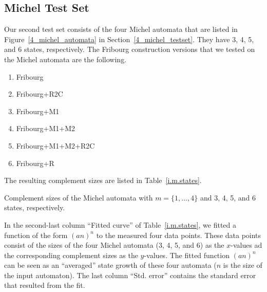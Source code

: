 


\subsection{Michel Test Set}
\label{5_internal_michel}
Our second test set consists of the four Michel automata that are listed in Figure~\ref{4_michel_automata} in Section~\ref{4_michel_testset}. They have 3, 4, 5, and 6 states, respectively. The Fribourg construction versions that we tested on the Michel automata are the following.
\begin{enumerate}
\item Fribourg
\item Fribourg+R2C
\item Fribourg+M1
\item Fribourg+M1+M2
\item Fribourg+M1+M2+R2C
\item Fribourg+R
\end{enumerate}

The resulting complement sizes are listed in Table~\ref{i.m.states}.

\begin{table}[htb]
\centering

\caption{Complement sizes of the Michel automata with $m=\{1,\dots,4\}$ and 3, 4, 5, and 6 states, respectively. }
\label{i.m.states}
\end{table}

In the second-last column ``Fitted curve'' of Table~\ref{i.m.states}, we fitted a function of the form $(an)^n$ to the measured four data points. These data points consist of the sizes of the four Michel automata (3, 4, 5, and 6) as the $x$-values ad the corresponding complement sizes as the $y$-values. The fitted function $(an)^n$ can be seen as an ``averaged'' state growth of these four automata ($n$ is the size of the input automaton). The last column ``Std. error'' contains the standard error that resulted from the fit.

